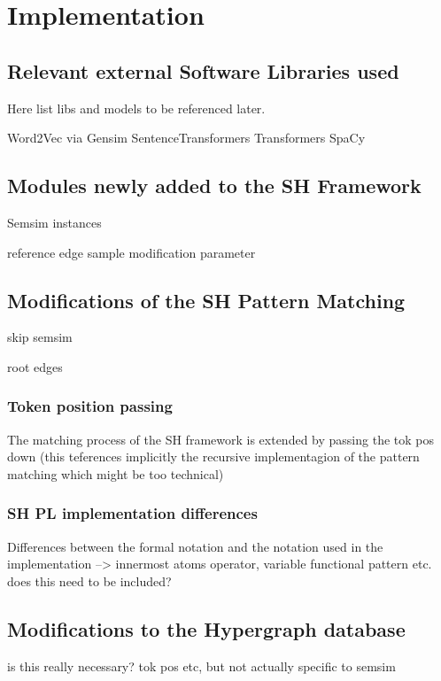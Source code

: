 \documentclass[11pt]{scrreprt}
\begin{document}





\chapter{Implementation}
\label{cha:implementation}

\section{Relevant external Software Libraries used}
Here list libs and models to be referenced later.

Word2Vec via Gensim
SentenceTransformers
Transformers
SpaCy

\section{Modules newly added to the SH Framework}
Semsim instances

reference edge sample modification parameter


\section{Modifications of the SH Pattern Matching}
skip semsim

root edges

\subsection{Token position passing}
The matching process of the SH framework is extended by passing the tok pos down (this teferences implicitly the recursive implementagion of the pattern matching which might be too technical)


\subsection{SH PL implementation differences}
Differences between the formal notation and the notation used in the implementation
--> innermost atoms operator, variable functional pattern etc.
does this need to be included?

\section{Modifications to the Hypergraph database}
is this really necessary? tok pos etc, but not actually specific to semsim
\end{document}
